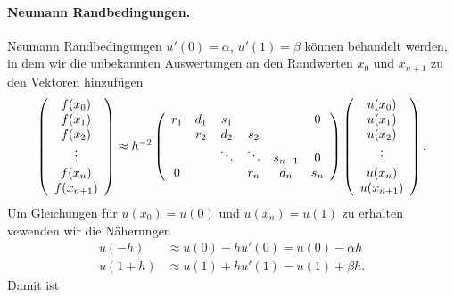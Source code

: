 \documentclass[
]{mycourse}
\theoremstyle{mythm}
\theoremstyle{break}
\begin{document}
\paragraph{Neumann Randbedingungen.} 
Neumann Randbedingungen $u'(0)=\alpha$, $u'(1)=\beta$ können behandelt werden, in dem 
wir die unbekannten Auswertungen an den Randwerten $x_0$ und $x_{n+1}$ zu den Vektoren hinzufügen
\[
\left( \begin{array}{c} f(x_0)\\ f(x_1)\\ f(x_2)\\ \vdots \\ f(x_{n})\\ f(x_{n+1}) \end{array}\right)
\approx h^{-2} \left( \begin{array}{c c c c c c} r_1 & d_1 & s_1 &  & & 0\\ & r_2 & d_2 & s_2 \\ & & \ddots & \ddots & s_{n-1} & 0\\ 0 &  &  & r_{n} & d_{n} & s_{n}\end{array}\right) 
\left( \begin{array}{c} u(x_0) \\ u(x_1)\\ u(x_2)\\ \vdots \\ u(x_{n}) \\ u(x_{n+1})\end{array}\right).
\]
Um Gleichungen für $u(x_0)=u(0)$ und $u(x_n)=u(1)$ zu erhalten vewenden wir die Näherungen
\begin{align*}
u(-h) & \approx u(0)-hu'(0)=u(0)-\alpha h\\
u(1+h) & \approx u(1)+hu'(1)=u(1)+ \beta h.
\end{align*}
Damit ist
\end{document}
